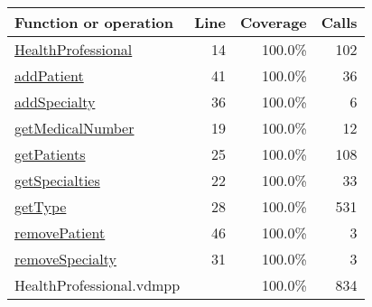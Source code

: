 \begin{longtable}{|l|r|r|r|}
\hline
Function or operation & Line & Coverage & Calls \\
\hline
\hline
\hyperref[HealthProfessional:14]{HealthProfessional} & 14&100.0\% & 102 \\
\hline
\hyperref[addPatient:41]{addPatient} & 41&100.0\% & 36 \\
\hline
\hyperref[addSpecialty:36]{addSpecialty} & 36&100.0\% & 6 \\
\hline
\hyperref[getMedicalNumber:19]{getMedicalNumber} & 19&100.0\% & 12 \\
\hline
\hyperref[getPatients:25]{getPatients} & 25&100.0\% & 108 \\
\hline
\hyperref[getSpecialties:22]{getSpecialties} & 22&100.0\% & 33 \\
\hline
\hyperref[getType:28]{getType} & 28&100.0\% & 531 \\
\hline
\hyperref[removePatient:46]{removePatient} & 46&100.0\% & 3 \\
\hline
\hyperref[removeSpecialty:31]{removeSpecialty} & 31&100.0\% & 3 \\
\hline
\hline
HealthProfessional.vdmpp & & 100.0\% & 834 \\
\hline
\end{longtable}

